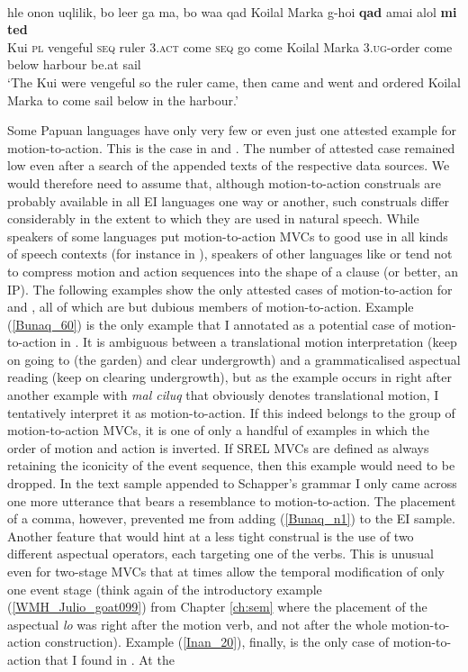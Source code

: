 \ea \label{KYO003}
\\
\gll hle onon uqlilik, bo leer ga ma, bo waa qad Koilal Marka g-hoi \textbf{qad} amai alol \textbf{mi} \textbf{ted} \\
Kui \textsc{pl} vengeful \textsc{seq} ruler \textsc{3}.\textsc{act} come \textsc{seq} go come Koilal Marka \textsc{3}.\textsc{ug}-order come below harbour be.at sail \\
\glft `The Kui were vengeful so the ruler came, then came and went and ordered Koilal Marka to come sail below in the harbour.'\\ 
\z

\newpage
\largerpage[-2]
Some Papuan languages have only very few or even just one attested example for motion-to-action. This is the case in  and . The number of attested case remained low even after a search of the appended texts of the respective data sources. We would therefore need to assume that, although motion-to-action construals are probably available in all EI languages one way or another, such construals differ considerably in the extent to which they are used in natural speech. While speakers of some languages put motion-to-action MVCs to good use in all kinds of speech contexts (for instance in ), speakers of other languages like  or  tend not to compress motion and action sequences into the shape of a clause (or better, an IP). The following examples show the only attested cases of motion-to-action for  and , all of which are but dubious members of motion-to-action. Example (\ref{Bunaq_60}) is the only example that I annotated as a potential case of motion-to-action in . It is ambiguous between a translational motion interpretation (keep on going to (the garden) and clear undergrowth) and a grammaticalised aspectual reading (keep on clearing undergrowth), but as the example occurs in \citet[463]{schapper2009bunaq} right after another example with \textit{mal ciluq} that obviously denotes translational motion, I tentatively interpret it as motion-to-action. If this indeed belongs to the group of motion-to-action MVCs, it is one of only a handful of examples in which the order of motion and action is inverted. If SREL MVCs are defined as always retaining the iconicity of the event sequence, then this example would need to be dropped. In the text sample appended to Schapper's grammar I only came across one more utterance that bears a resemblance to motion-to-action. The placement of a comma, however, prevented me from adding (\ref{Bunaq_n1}) to the EI sample. Another feature that would hint at a less tight construal is the use of two different aspectual operators, each targeting one of the verbs. This is unusual even for two-stage MVCs that at times allow the temporal modification of only one event stage (think again of the introductory example (\ref{WMH_Julio_goat099}) from Chapter \ref{ch:sem} where the placement of the aspectual \textit{lo} was right after the motion verb, and not after the whole motion-to-action construction). Example (\ref{Inan_20}), finally, is the only case of motion-to-action that I found in \citet{devries2004}. At the 